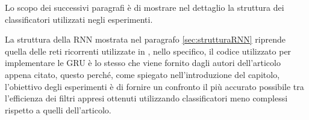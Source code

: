 \documentclass[../../main.tex]{subfiles}
\begin{document}
    Lo scopo dei successivi paragrafi è di mostrare nel dettaglio la struttura dei classificatori utilizzati negli esperimenti. 
    
    La struttura della RNN mostrata nel paragrafo \ref{sec:strutturaRNN} riprende quella delle reti ricorrenti utilizzate in \cite{ma2020}, nello specifico, il codice utilizzato per implementare le GRU è lo stesso che viene fornito dagli autori dell'articolo appena citato, questo perché, come spiegato nell'introduzione del capitolo, l'obiettivo degli esperimenti è di fornire un confronto il più accurato possibile tra l'efficienza dei  filtri appresi ottenuti utilizzando classificatori meno complessi rispetto a quelli dell'articolo. 
\end{document}
